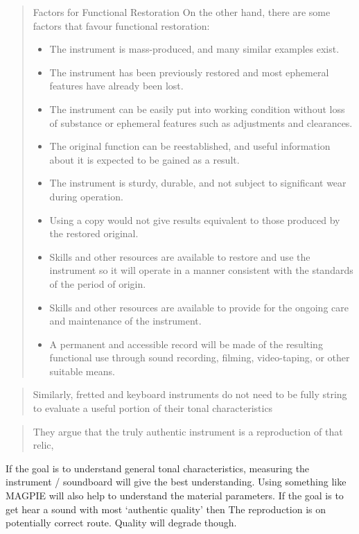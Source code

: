 \begin{quotation}
    Factors for Functional Restoration On the other hand, there are some factors
that favour functional restoration:
\begin{itemize}
    \item The instrument is mass-produced, and many similar examples exist.
    \item The instrument has been previously restored and most ephemeral
    features have already been lost.
    \item The instrument can be easily put into working condition without loss
    of substance or ephemeral features such as adjustments and clearances.
    \item The original function can be reestablished, and useful information
    about it is expected to be gained as a result.
    \item The instrument is sturdy, durable, and not subject to significant wear
    during operation.
    \item Using a copy would not give results equivalent to those produced by
    the restored original.
    \item Skills and other resources are available to restore and use the
    instrument so it will operate in a manner consistent with the standards of
    the period of origin.
    \item Skills and other resources are available to provide for the ongoing
    care and maintenance of the instrument.
    \item A permanent and accessible record will be made of the resulting
    functional use through sound recording, filming, video-taping, or other
    suitable means.
\end{itemize}
\end{quotation}

\begin{quotation}
    Similarly, fretted and keyboard instruments do not need to be fully string
    to evaluate a useful portion of their tonal characteristics    
\end{quotation}

\begin{quotation}
    They argue that the truly authentic instrument is a reproduction of that
    relic,
\end{quotation}

If the goal is to understand general tonal characteristics, measuring the
instrument / soundboard will give the best understanding. Using something like
MAGPIE will also help to understand the material parameters. If the goal is to
get hear a sound with most `authentic quality' then The reproduction is on
potentially correct route. Quality will degrade though.


